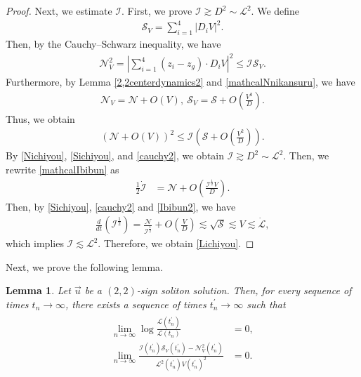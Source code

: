 \documentclass[reqno]{amsart}
\theoremstyle{plain}
\newtheorem{lemma}[theorem]{Lemma}
\theoremstyle{definition}
\numberwithin{equation}{section}
\begin{document}
\begin{proof}
Next, we estimate $\mathcal{I}$. First, we prove $\mathcal{I}\gtrsim D^2\sim \mathcal{L}^2$. We define
\begin{align*}
\mathcal{S}_V=\sum_{i=1}^4\left|D_iV\right|^2.
\end{align*}
Then, by the Cauchy--Schwarz inequality, we have
\begin{align}\label{cauchy1}
\mathcal{N}_V^2=\left|\sum_{i=1}^4\left(z_i-z_g\right)\cdot D_iV\right|^2\leq \mathcal{I}\mathcal{S}_V.
\end{align}
Furthermore, by Lemma \ref{2,2centerdynamics2} and \eqref{mathcalNnikansuru}, we have
\begin{align}\label{NVtoSVes}
\mathcal{N}_V=\mathcal{N}+O\left(V\right),\ \mathcal{S}_V=\mathcal{S}+O\left(\frac{V^2}{D}\right).
\end{align}
Thus, we obtain 
\begin{align}\label{cauchy2}
\left(\mathcal{N}+O(V)\right)^2\leq \mathcal{I}\left(\mathcal{S}+O\left(\frac{V^2}{D}\right)\right).
\end{align}
By \eqref{Nichiyou}, \eqref{Sichiyou}, and \eqref{cauchy2}, we obtain $\mathcal{I}\gtrsim D^2\sim \mathcal{L}^2$. Then, we rewrite \eqref{mathcalIbibun} as 
\begin{align}\label{Ibibun2}
\frac{1}{2}\dot{\mathcal{I}}&=\mathcal{N}+O\left(\frac{\mathcal{I}^{\frac{1}{2}}V}{D}\right).
\end{align}
Then, by \eqref{Sichiyou}, \eqref{cauchy2} and \eqref{Ibibun2}, we have
\begin{align*}
\frac{d}{dt}\left(\mathcal{I}^{\frac{1}{2}}\right)=\frac{\mathcal{N}}{\mathcal{I}^{\frac{1}{2}}}+O\left(\frac{V}{D}\right)\lesssim \sqrt{\mathcal{S}}\lesssim V\lesssim \dot{\mathcal{L}},
\end{align*}
which implies $\mathcal{I}\lesssim \mathcal{L}^2$. Therefore, we obtain \eqref{Lichiyou}.
\end{proof}

Next, we prove the following lemma.
\begin{lemma}\label{tenretulemma1}
Let $\vec{u}$ be a $(2,2)$-sign soliton solution. Then, for every sequence of times $t_n\to\infty$, there exists a sequence of times $t_n^{\prime}\to\infty$ such that
\begin{align}
\begin{aligned}\label{hodai0802}
\lim_{n\to\infty}
\log{\frac{\mathcal{L}(t_n^{\prime})}{\mathcal{L}(t_n)}}
&=0,
\\
\lim_{n\to\infty}
\frac{
\mathcal{I}(t_n^{\prime})\mathcal{S}_V(t_n^{\prime})
-\mathcal{N}_V^2(t_n^{\prime})
}{
\mathcal{L}^2(t_n^{\prime})V(t_n^{\prime})^2
}
&=0.
\end{aligned}
\end{align}
\end{lemma}
\end{document}
